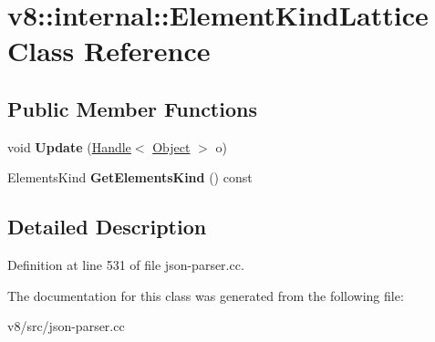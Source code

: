 \hypertarget{classv8_1_1internal_1_1ElementKindLattice}{}\section{v8\+:\+:internal\+:\+:Element\+Kind\+Lattice Class Reference}
\label{classv8_1_1internal_1_1ElementKindLattice}
\subsection*{Public Member Functions}
\begin{DoxyCompactItemize}
\item 
\mbox{\label{classv8_1_1internal_1_1ElementKindLattice_a1861944857ad22e7236d32cb8fe0e452}} 
void {\bfseries Update} (\mbox{\hyperlink{classv8_1_1internal_1_1Handle}{Handle}}$<$ \mbox{\hyperlink{classv8_1_1internal_1_1Object}{Object}} $>$ o)
\item 
\mbox{\label{classv8_1_1internal_1_1ElementKindLattice_a6a1773ad038f8b85f9556422f20ec21b}} 
Elements\+Kind {\bfseries Get\+Elements\+Kind} () const
\end{DoxyCompactItemize}


\subsection{Detailed Description}


Definition at line 531 of file json-\/parser.\+cc.



The documentation for this class was generated from the following file\+:\begin{DoxyCompactItemize}
\item 
v8/src/json-\/parser.\+cc\end{DoxyCompactItemize}
